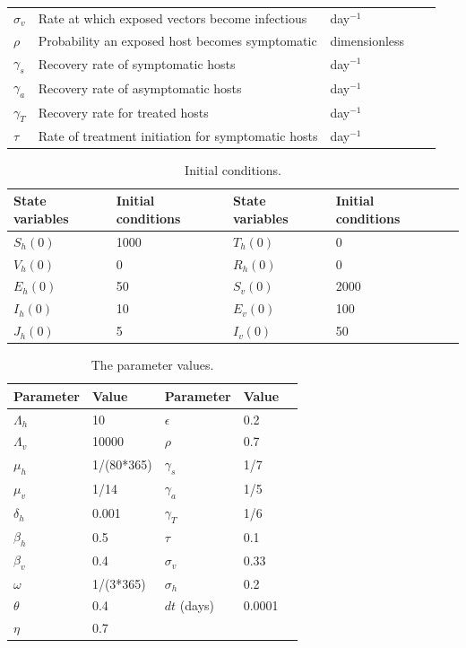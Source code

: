 \documentclass[9pt]{article}
\numberwithin{equation}{section}
\begin{document}
\begin{table}[!ht]
\begin{tabular}{lllll@{}}
        $\sigma_v$ & Rate at which exposed vectors become infectious & day$^{-1}$\\
        $\rho$ & Probability an exposed host becomes symptomatic& dimensionless\\
        $\gamma_s$ & Recovery rate of symptomatic hosts & day$^{-1}$\\
        $\gamma_a$ & Recovery rate of asymptomatic hosts & day$^{-1}$\\
        $\gamma_T$ & Recovery rate for treated hosts & day$^{-1}$\\
        $\tau$ & Rate of treatment initiation for symptomatic hosts & day$^{-1}$\\
        \bottomrule
    \end{tabular}
\end{table}

\begin{table}[!ht]
    \centering
    \caption{Initial conditions.}
    \label{table3}
    \begin{tabular}{ll|lll@{}}
        \toprule
        State variables& Initial conditions&State variables & Initial conditions\\
        \midrule
        $S_h(0)$ & 1000 & $T_h(0)$ & 0\\
        $V_h(0)$ & 0     & $R_h(0)$ & 0\\
        $E_h(0)$ & 50    & $S_v(0)$ & 2000\\
        $I_h(0)$ & 10    & $E_v(0)$ & 100\\
        $J_h(0)$ & 5     & $I_v(0)$ & 50\\
        \bottomrule
    \end{tabular}
\end{table}

\begin{table}[!ht]
    \centering
    \caption{The parameter values.}
    \label{table2}
    \begin{tabular}{ll|lll@{}}
        \toprule
        Parameter& Value&Parameter& Value\\
        \midrule
        $\Lambda_h$ & 10         & $\epsilon$ & 0.2\\
        $\Lambda_v$ & 10000      & $\rho$     & 0.7\\
        $\mu_h$     & 1/(80*365) & $\gamma_s$ & 1/7\\
        $\mu_v$     & 1/14       & $\gamma_a$ & 1/5\\
        $\delta_h$  & 0.001      & $\gamma_T$ & 1/6\\
        $\beta_h$   & 0.5        & $\tau$     & 0.1\\
        $\beta_v$   & 0.4        & $\sigma_v$  & 0.33 \\
        $\omega$    & 1/(3*365)  &  $\sigma_h$  & 0.2 \\
        $\theta$    & 0.4        & $dt$ (days) & 0.0001 \\
        $\eta$      & 0.7        & & \\
        \bottomrule
    \end{tabular}
\end{table}
\end{document}
